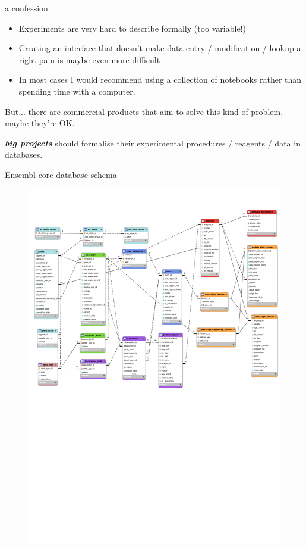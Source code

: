 \documentclass[pdf]{beamer}
\begin{document}
\begin{frame}{a confession}
  \pause
  \begin{itemize}
  \item Experiments are very hard to describe formally (too variable!)
    \pause
  \item Creating an interface that doesn't make data entry / modification / 
    lookup a right pain is maybe even more difficult
    \pause
  \item In most cases I would recommend using a collection of notebooks
    rather than spending time with a computer.
  \end{itemize}

  But... there are commercial products that aim to solve this kind of problem, maybe they're OK.
  \pause

  \emph{\bfseries big projects} should formalise their experimental procedures / reagents / data
  in databases.
  
\end{frame}

\begin{frame}{Ensembl core database schema}
  \begin{figure}[ht]
    \includegraphics[width=\textwidth]{images/fundamental_tables_core_crop1}
  \end{figure}
\end{frame}
\end{document}
